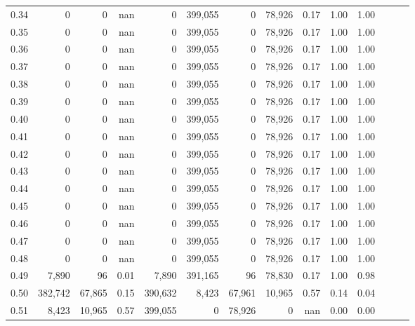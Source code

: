 \begin{tabular}{rrrrrrrrrrrrrr}
0.34 &        0 &       0 &   nan &        0 &  399,055 &       0 &  78,926 &  0.17 &  1.00 &      1.00 \\
0.35 &        0 &       0 &   nan &        0 &  399,055 &       0 &  78,926 &  0.17 &  1.00 &      1.00 \\
0.36 &        0 &       0 &   nan &        0 &  399,055 &       0 &  78,926 &  0.17 &  1.00 &      1.00 \\
0.37 &        0 &       0 &   nan &        0 &  399,055 &       0 &  78,926 &  0.17 &  1.00 &      1.00 \\
0.38 &        0 &       0 &   nan &        0 &  399,055 &       0 &  78,926 &  0.17 &  1.00 &      1.00 \\
0.39 &        0 &       0 &   nan &        0 &  399,055 &       0 &  78,926 &  0.17 &  1.00 &      1.00 \\
0.40 &        0 &       0 &   nan &        0 &  399,055 &       0 &  78,926 &  0.17 &  1.00 &      1.00 \\
0.41 &        0 &       0 &   nan &        0 &  399,055 &       0 &  78,926 &  0.17 &  1.00 &      1.00 \\
0.42 &        0 &       0 &   nan &        0 &  399,055 &       0 &  78,926 &  0.17 &  1.00 &      1.00 \\
0.43 &        0 &       0 &   nan &        0 &  399,055 &       0 &  78,926 &  0.17 &  1.00 &      1.00 \\
0.44 &        0 &       0 &   nan &        0 &  399,055 &       0 &  78,926 &  0.17 &  1.00 &      1.00 \\
0.45 &        0 &       0 &   nan &        0 &  399,055 &       0 &  78,926 &  0.17 &  1.00 &      1.00 \\
0.46 &        0 &       0 &   nan &        0 &  399,055 &       0 &  78,926 &  0.17 &  1.00 &      1.00 \\
0.47 &        0 &       0 &   nan &        0 &  399,055 &       0 &  78,926 &  0.17 &  1.00 &      1.00 \\
0.48 &        0 &       0 &   nan &        0 &  399,055 &       0 &  78,926 &  0.17 &  1.00 &      1.00 \\
0.49 &    7,890 &      96 &  0.01 &    7,890 &  391,165 &      96 &  78,830 &  0.17 &  1.00 &      0.98 \\
0.50 &  382,742 &  67,865 &  0.15 &  390,632 &    8,423 &  67,961 &  10,965 &  0.57 &  0.14 &      0.04 \\
0.51 &    8,423 &  10,965 &  0.57 &  399,055 &        0 &  78,926 &       0 &   nan &  0.00 &      0.00 \\

\end{tabular}

